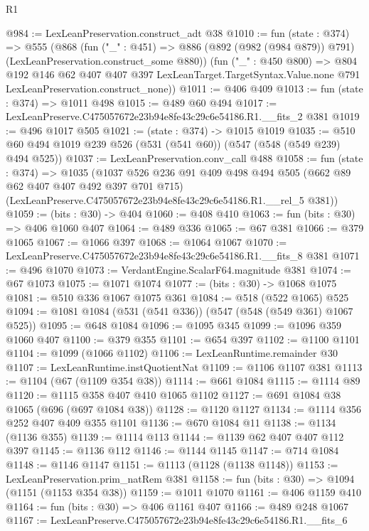 \begin{lexlean}{R1}
\begin{coremodule}
@984 := LexLeanPreservation.construct_adt @38
@1010 := fun (state : @374) =>
  @555
    (@868
      (fun ("_" : @451) =>
      @886 (@892 (@982 (@984 @879)) @791) (LexLeanPreservation.construct_some @880))
      (fun ("_" : @450 @800) =>
      @804
        @192
        @146
        @62
        @407
        @407
        @397
        LexLeanTarget.TargetSyntax.Value.none
        @791
        LexLeanPreservation.construct_none))
@1011 := @406 @409
@1013 := fun (state : @374) => @1011 @498
@1015 := @489 @60 @494
@1017 := LexLeanPreserve.C475057672e23b94e8fe43c29c6e54186.R1.__fits_2 @381
@1019 := @496 @1017 @505
@1021 := (state : @374) -> @1015 @1019
@1035 := @510 @60 @494 @1019 @239 @526 (@531 (@541 @60)) (@547 (@548 (@549 @239) @494 @525))
@1037 := LexLeanPreservation.conv_call @488
@1058 := fun (state : @374) =>
  @1035
    (@1037
      @526
      @236
      @91
      @409
      @498
      @494
      @505
      (@662 @89 @62 @407 @407 @492 @397 @701 @715)
      (LexLeanPreserve.C475057672e23b94e8fe43c29c6e54186.R1.__rel_5 @381))
@1059 := (bits : @30) -> @404
@1060 := @408 @410
@1063 := fun (bits : @30) => @406 @1060 @407
@1064 := @489 @336
@1065 := @67 @381
@1066 := @379 @1065
@1067 := @1066 @397
@1068 := @1064 @1067
@1070 := LexLeanPreserve.C475057672e23b94e8fe43c29c6e54186.R1.__fits_8 @381
@1071 := @496 @1070
@1073 := VerdantEngine.ScalarF64.magnitude @381
@1074 := @67 @1073
@1075 := @1071 @1074
@1077 := (bits : @30) -> @1068 @1075
@1081 := @510 @336 @1067 @1075 @361
@1084 := @518 (@522 @1065) @525
@1094 := @1081 @1084 (@531 (@541 @336)) (@547 (@548 (@549 @361) @1067 @525))
@1095 := @648 @1084
@1096 := @1095 @345
@1099 := @1096 @359 @1060 @407
@1100 := @379 @355
@1101 := @654 @397
@1102 := @1100 @1101
@1104 := @1099 (@1066 @1102)
@1106 := LexLeanRuntime.remainder @30
@1107 := LexLeanRuntime.instQuotientNat
@1109 := @1106 @1107 @381
@1113 := @1104 (@67 (@1109 @354 @38))
@1114 := @661 @1084
@1115 := @1114 @89
@1120 := @1115 @358 @407 @410 @1065 @1102
@1127 := @691 @1084 @38 @1065 (@696 (@697 @1084 @38))
@1128 := @1120 @1127
@1134 := @1114 @356 @252 @407 @409 @355 @1101
@1136 := @670 @1084 @11
@1138 := @1134 (@1136 @355)
@1139 := @1114 @113
@1144 := @1139 @62 @407 @407 @112 @397
@1145 := @1136 @112
@1146 := @1144 @1145
@1147 := @714 @1084
@1148 := @1146 @1147
@1151 := @1113 (@1128 (@1138 @1148))
@1153 := LexLeanPreservation.prim_natRem @381
@1158 := fun (bits : @30) => @1094 (@1151 (@1153 @354 @38))
@1159 := @1011 @1070
@1161 := @406 @1159 @410
@1164 := fun (bits : @30) => @406 @1161 @407
@1166 := @489 @248 @1067
@1167 := LexLeanPreserve.C475057672e23b94e8fe43c29c6e54186.R1.__fits_6

\end{coremodule}
\end{lexlean}
